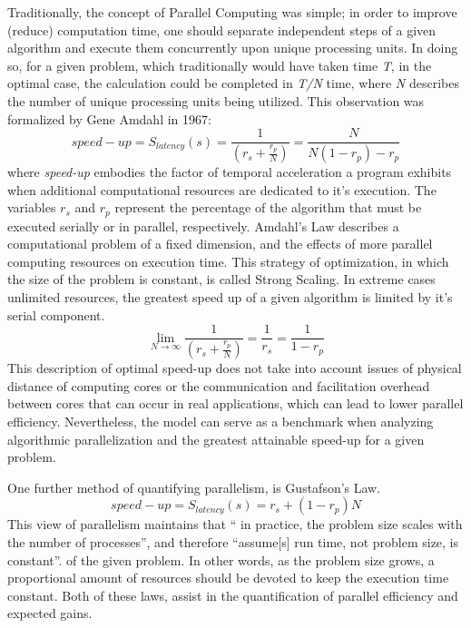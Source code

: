 Traditionally, the concept of Parallel Computing was simple; in order to improve
(reduce) computation time, one should separate independent steps of a given algorithm
and execute them concurrently upon unique processing units.  In doing so, for a given
problem, which traditionally would have taken time \textit{T}, in the optimal case,
the calculation could be completed in \textit{T/N} time, where \textit{N} describes
the number of unique processing units being utilized.  This observation was formalized
by Gene Amdahl in 1967\cite{Wilt}:
%
\begin{equation}
  \tag{Amdahl's Law}
  speed-up = S_{latency}(s)= \frac{1}{(r_{s} + \frac{r_{p}}{N})} = \frac{N}{N(1-r_{p})-r_{p}}
  \label{egn:Amdahl}
\end{equation}
%
where \textit{\gls{speed-up}} embodies the factor of temporal acceleration a program
exhibits when additional computational resources are dedicated to it's execution.
The variables \textit{$r_{s}$} and \textit{$ r_{p} $} represent the percentage of
 the algorithm that must be executed serially or in parallel, respectively.
   Amdahl's Law describes a computational problem of a fixed dimension,
and the effects of more parallel computing resources on execution time.
This strategy of optimization, in which the size of the problem is constant,
 is called Strong Scaling.
In extreme cases unlimited resources, the greatest speed up of a given algorithm
 is limited by it's serial component.
%
\begin{equation}
 \lim_{N\to\infty}  \frac{1}{(r_{s} + \frac{r_{p}}{N})} = \frac{1}{r_{s}} = \frac{1}{1-r_{p}}
\end{equation}
%
This description of optimal \gls{speed-up} does not take into account issues of physical
distance of computing cores or the communication and facilitation overhead between
cores that can occur in real applications, which can lead to lower parallel efficiency.
Nevertheless, the model can serve as a benchmark when analyzing algorithmic
parallelization and  the greatest attainable speed-up for a given problem.\par

One further method of quantifying parallelism, is Gustafson's Law\cite{Gustafson}.
%
\begin{equation}
  \tag{Gustofson's Law}
  speed-up = S_{latency}(s) = r_{s} + (1 - r_{p})N
\end{equation}
%
This view of parallelism maintains that `` in practice, the problem
size scales with the number of processes'', and therefore
``assume[s] run time, not problem size, is constant''.
of the given problem. In other words, as the problem size grows, a proportional
amount of resources should be devoted to keep the execution time constant.
Both of these laws, assist in the quantification of parallel efficiency and
expected gains.

